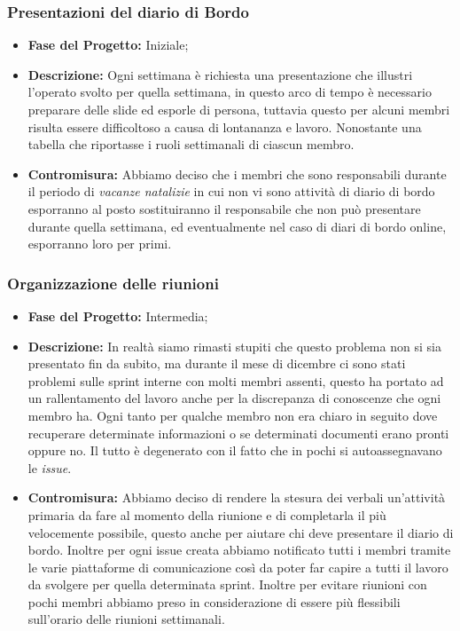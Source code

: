 \documentclass{article}
\begin{document}
\subsubsection{Presentazioni del diario di Bordo}
\begin{itemize}
    \item \textbf{Fase del Progetto:} Iniziale;
    \item \textbf{Descrizione:} Ogni settimana è richiesta una presentazione che illustri l'operato svolto per quella settimana, in questo arco di tempo è necessario preparare delle slide ed esporle di persona, tuttavia questo per alcuni membri risulta essere difficoltoso a causa di lontananza e lavoro. Nonostante una tabella che riportasse i ruoli settimanali di ciascun membro.
    \item \textbf{Contromisura:} Abbiamo deciso che i membri che sono responsabili durante il periodo di \textit{vacanze natalizie} in cui non vi sono attività di diario di bordo esporranno al posto sostituiranno il responsabile che non può presentare durante quella settimana, ed eventualmente nel caso di diari di bordo online, esporranno loro per primi.
\end{itemize}
\subsubsection{Organizzazione delle riunioni}
\begin{itemize}
    \item \textbf{Fase del Progetto:} Intermedia;
    \item \textbf{Descrizione:} In realtà siamo rimasti stupiti che questo problema non si sia presentato fin da subito, ma durante il mese di dicembre ci sono stati problemi sulle sprint interne con molti membri assenti, questo ha portato ad un rallentamento del lavoro anche per la discrepanza di conoscenze che ogni membro ha. Ogni tanto per qualche membro non era chiaro in seguito dove recuperare determinate informazioni o se determinati documenti erano pronti oppure no. Il tutto è degenerato con il fatto che in pochi si autoassegnavano le \textit{issue}.
    \item \textbf{Contromisura:} Abbiamo deciso di rendere la stesura dei verbali un'attività primaria da fare al momento della riunione e di completarla il più velocemente possibile, questo anche per aiutare chi deve presentare il diario di bordo. Inoltre per ogni issue creata abbiamo notificato tutti i membri tramite le varie piattaforme di comunicazione così da poter far capire a tutti il lavoro da svolgere per quella determinata sprint. Inoltre per evitare riunioni con pochi membri abbiamo preso in considerazione di essere più flessibili sull'orario delle riunioni settimanali.
\end{itemize}
\end{document}
